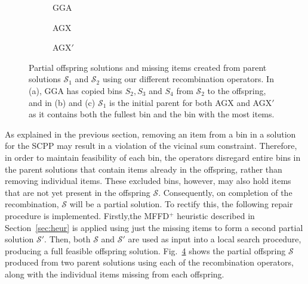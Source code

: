 \documentclass[a4paper,11pt,authoryear]{elsarticle}
\begin{document}
\begin{figure}[h!]	
	\centering
	\begin{minipage}{0.28\textwidth}
		
	\end{minipage} \hspace{15mm}
	\begin{minipage}{0.28\textwidth}
		
	\end{minipage}
\end{figure}

\begin{figure}[h!]	
	\centering
	\begin{subfigure}[h]{0.3\textwidth}
		
		\caption{GGA}
		\label{fig:gga}
	\end{subfigure} \hspace{5mm}
	\begin{subfigure}[h]{0.3\textwidth}
		
		\caption{AGX}
		\label{fig:agx}
	\end{subfigure} \hspace{5mm}
	\begin{subfigure}[h]{0.3\textwidth}
		
		\caption{AGX$'$}
		\label{fig:agxdash}
	\end{subfigure}
	\caption{Partial offspring solutions and missing items created from parent solutions $\mathcal{S}_1$ and $\mathcal{S}_2$ using our different recombination operators. In (a), GGA has copied bins $S_2, S_3$ and $S_4$ from $\mathcal{S}_2$ to the offspring, and in (b) and (c) $\mathcal{S}_1$ is the initial parent for both AGX and AGX$'$ as it contains both the fullest bin and the bin with the most items.}
	\label{fig:recomb}
\end{figure}

\noindent As explained in the previous section, removing an item from a bin in a solution for the SCPP may result in a violation of the vicinal sum constraint. Therefore, in order to maintain feasibility of each bin, the operators disregard entire bins in the parent solutions that contain items already in the offspring, rather than removing individual items. These excluded bins, however, may also hold items that are not yet present in the offspring $\mathcal{S}$. Consequently, on completion of the recombination, $\mathcal{S}$ will be a partial solution. To rectify this, the following repair procedure is implemented. Firstly,the MFFD$^+$ heuristic described in Section~\ref{sec:heur} is applied using just the missing items to form a second partial solution $\mathcal{S}'$. Then, both $\mathcal{S}$ and $\mathcal{S}'$ are used as input into a local search procedure, producing a full feasible offspring solution. Fig.~\ref{fig:recomb} shows the partial offspring $\mathcal{S}$ produced from two parent solutions using each of the recombination operators, along with the individual items missing from each offspring.
\end{document}
